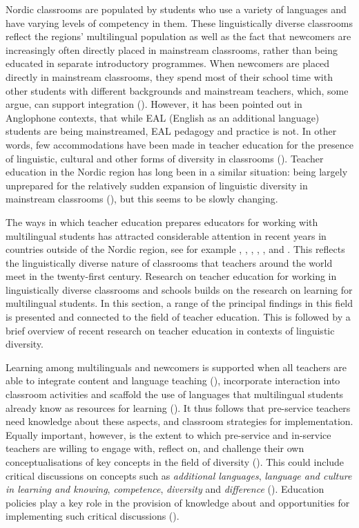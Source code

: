 \documentclass[output=paper]{langscibook}
\begin{document}
Nordic classrooms are populated by students who use a variety of languages and have varying levels of competency in them. These linguistically diverse classrooms reflect the regions’ multilingual population as well as the fact that newcomers are increasingly often directly placed in mainstream classrooms, rather than being educated in separate introductory programmes. When newcomers are placed directly in mainstream classrooms, they spend most of their school time with other students with different backgrounds and mainstream teachers, which, some argue, can support integration (\citealt{KorpEtAl2019}). However, it has been pointed out in Anglophone contexts, that while EAL (English as an additional language) students are being mainstreamed, EAL pedagogy and practice is not. In other words, few accommodations have been made in teacher education for the presence of linguistic, cultural and other forms of diversity in classrooms (\citealt[3]{Liddicoat2022}). Teacher education in the Nordic region has long been in a similar situation: being largely unprepared for the relatively sudden expansion of linguistic diversity in mainstream classrooms (\citealt{Iversen2020, BrorssonLainio2015}), but this seems to be slowly changing.

The ways in which teacher education prepares educators for working with multilingual students has attracted considerable attention in recent years in countries outside of the Nordic region, see for example \citet{Benholz2017}, \citet{Cochran-smith2015}, \citet{FreemanFreeman2014}, \citet{KaramKibler2024}, \citet{Lucas2011}, \citet{WernickeEtAl2021} and \citet{FoleyEtAl2022}. This reflects the linguistically diverse nature of classrooms that teachers around the world meet in the twenty-first century. Research on teacher education for working in linguistically diverse classrooms and schools builds on the research on learning for multilingual students. In this section, a range of the principal findings in this field is presented and connected to the field of teacher education. This is followed by a brief overview of recent research on teacher education in contexts of linguistic diversity.  

Learning among multilinguals and newcomers is supported when all teachers are able to integrate content and language teaching (\citealt{Nusche2009}), incorporate interaction into classroom activities and scaffold the use of languages that multilingual students already know as resources for learning (\citealt{AxelssonMagnusson2012}). It thus follows that pre-service teachers need knowledge about these aspects, and classroom strategies for implementation. Equally important, however, is the extent to which pre-service and in-service teachers are willing to engage with, reflect on, and challenge their own conceptualisations of key concepts in the field of diversity (\citealt{Scarino2022}). This could include critical discussions on concepts such as \textit{additional languages}, \textit{language and culture in learning and knowing}, \textit{competence}, \textit{diversity} and \textit{difference} (\citealt{Scarino2022}). Education policies play a key role in the provision of knowledge about and opportunities for implementing such critical discussions (\citealt{BurtonEtAl2024,OjhaEtAl2024}).
\end{document}
